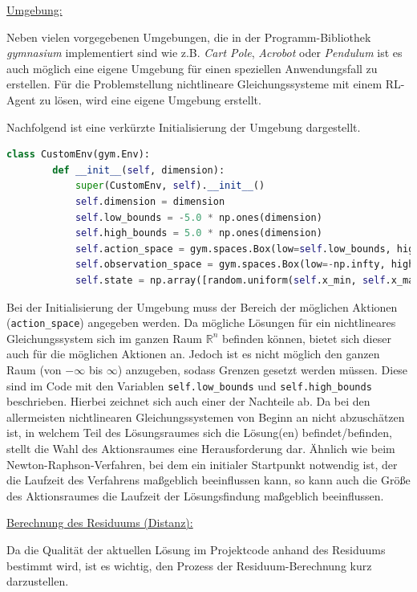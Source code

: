 \documentclass{article}
\def\code#1{\texttt{#1}}
\theoremstyle{newline}
\begin{document}
\begin{onehalfspace}
\underline{Umgebung:}
\smallskip

Neben vielen vorgegebenen Umgebungen, die in der Programm-Bibliothek \textit{gymnasium} implementiert sind wie z.B. \textit{Cart Pole}, \textit{Acrobot} oder \textit{Pendulum} ist es auch möglich eine eigene Umgebung für einen speziellen Anwendungsfall zu erstellen. Für die Problemstellung nichtlineare Gleichungssysteme mit einem RL-Agent zu lösen, wird eine eigene Umgebung erstellt. 

Nachfolgend ist eine verkürzte Initialisierung der Umgebung dargestellt.

\begin{lstlisting}[language=Python, caption={Initialisierung der Umgebung}, label={lst:python}]
	class CustomEnv(gym.Env):
		def __init__(self, dimension):
			super(CustomEnv, self).__init__()
			self.dimension = dimension
			self.low_bounds = -5.0 * np.ones(dimension)
			self.high_bounds = 5.0 * np.ones(dimension)
			self.action_space = gym.spaces.Box(low=self.low_bounds, high=self.high_bounds, dtype=np.float64)
			self.observation_space = gym.spaces.Box(low=-np.infty, high=np.infty, shape=(dimension,))
			self.state = np.array([random.uniform(self.x_min, self.x_max), random.uniform(self.y_min, self.y_max)] + [0.0] * dimension)	
\end{lstlisting}

Bei der Initialisierung der Umgebung muss der Bereich der möglichen Aktionen (\code{action\_space}) angegeben werden. Da mögliche Lösungen für ein nichtlineares Gleichungssystem sich im ganzen Raum $\mathbb{R}^n$ befinden können, bietet sich dieser auch für die möglichen Aktionen an. Jedoch ist es nicht möglich den ganzen Raum (von $-\infty$ bis $\infty$) anzugeben, sodass Grenzen gesetzt werden müssen. Diese sind im Code mit den Variablen \code{self.low\_bounds} und \code{self.high\_bounds} beschrieben. Hierbei zeichnet sich auch einer der Nachteile ab. Da bei den allermeisten nichtlinearen Gleichungssystemen von Beginn an nicht abzuschätzen ist, in welchem Teil des Lösungsraumes sich die Lösung(en) befindet/befinden, stellt die Wahl des Aktionsraumes eine Herausforderung dar. Ähnlich wie beim Newton-Raphson-Verfahren, bei dem ein initialer Startpunkt notwendig ist, der die Laufzeit des Verfahrens maßgeblich beeinflussen kann, so kann auch die Größe des Aktionsraumes die Laufzeit der Lösungsfindung maßgeblich beeinflussen.
\bigskip

\underline{Berechnung des Residuums (Distanz):}
\smallskip

Da die Qualität der aktuellen Lösung im Projektcode anhand des Residuums bestimmt wird, ist es wichtig, den Prozess der Residuum-Berechnung kurz darzustellen.
\medskip


\end{onehalfspace}
\end{document}
